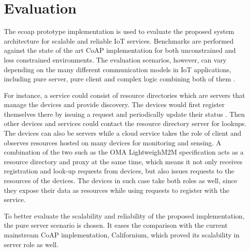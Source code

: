 \chapter{Evaluation}\label{ch5}

The ecoap prototype implementation is used to evaluate the proposed system architecture for scalable and reliable IoT services. Benchmarks are performed against the state of the art CoAP implementation for both unconstrained and less constrained environments. The evaluation scenarios, however, can vary depending on the many different communication models in IoT applications, including pure server, pure client and complex logic combining both of them \cite{kovatsch2015scalable}. 

For instance, a service could consist of resource directories which are servers that manage the devices and provide discovery. The devices would first register themselves there by issuing a request and periodically update their status \cite{}. Then other devices and services could contact the resource directory server for lookups. The devices can also be servers while a cloud service takes the role of client and observes resources hosted on many devices for monitoring and sensing. A combination of the two such as the OMA LightweighM2M \cite{lwm2m} specification acts as a resource directory and proxy at the same time, which means it not only receives registration and look-up requests from devices, but also issues requests to the resources of the devices. The devices in such case take both roles as well, since they expose their data as resources while using requests to register with the service.

To better evaluate the scalability and reliability of the proposed implementation, the pure server scenario is chosen. It eases the comparison with the current mainstream CoAP implementation, Californium, which proved its scalability in server role as well.


